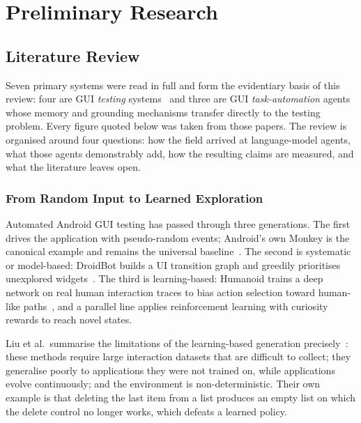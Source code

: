 \chapter{Preliminary Research}
\label{ch:research}

\section{Literature Review}
\label{sec:literature}

Seven primary systems were read in full and form the evidentiary basis of this
review: four are GUI \emph{testing}
systems~\cite{gptdroid,droidagent,auitestagent,xuatcopilot} and three are GUI
\emph{task-automation} agents~\cite{autodroid,appagent,appagentx} whose memory
and grounding mechanisms transfer directly to the testing problem. Every figure
quoted below was taken from those papers. The review is organised around four
questions: how the field arrived at language-model agents, what those agents
demonstrably add, how the resulting claims are measured, and what the
literature leaves open.

\subsection{From Random Input to Learned Exploration}
\label{subsec:lineage}

Automated Android GUI testing has passed through three generations. The first
drives the application with pseudo-random events; Android's own Monkey is the
canonical example and remains the universal baseline~\cite{monkey}. The second
is systematic or model-based: DroidBot builds a UI transition graph and
greedily prioritises unexplored widgets~\cite{droidbot}. The third is
learning-based: Humanoid trains a deep network on real human interaction traces
to bias action selection toward human-like paths~\cite{humanoid}, and a
parallel line applies reinforcement learning with curiosity rewards to reach
novel states.

Liu et al.\ summarise the limitations of the learning-based generation
precisely~\cite{gptdroid}: these methods require large interaction datasets
that are difficult to collect; they generalise poorly to applications they were
not trained on, while applications evolve continuously; and the environment is
non-deterministic. Their own example is that deleting the last item from a list
produces an empty list on which the delete control no longer works, which
defeats a learned policy.

